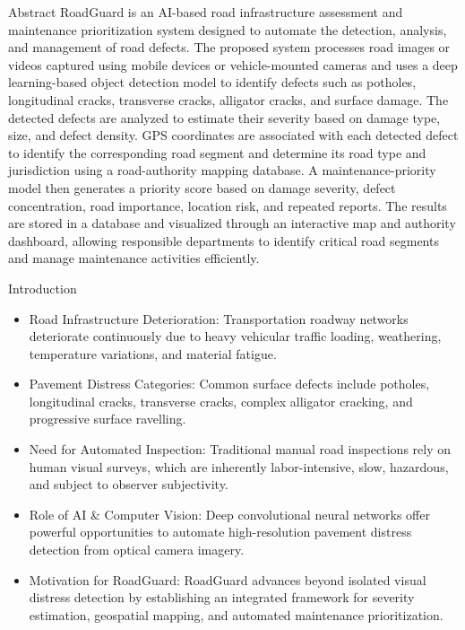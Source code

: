 \documentclass[10pt]{beamer}
\def\textbf#1{#1}%
\def\begin#1{}%
\def\end#1{}%
\begin{document}
\begin{frame}{Abstract}
    RoadGuard is an AI-based road infrastructure assessment and maintenance prioritization system designed to automate the detection, analysis, and management of road defects. The proposed system processes road images or videos captured using mobile devices or vehicle-mounted cameras and uses a deep learning-based object detection model to identify defects such as potholes, longitudinal cracks, transverse cracks, alligator cracks, and surface damage. The detected defects are analyzed to estimate their severity based on damage type, size, and defect density. GPS coordinates are associated with each detected defect to identify the corresponding road segment and determine its road type and jurisdiction using a road-authority mapping database. A maintenance-priority model then generates a priority score based on damage severity, defect concentration, road importance, location risk, and repeated reports. The results are stored in a database and visualized through an interactive map and authority dashboard, allowing responsible departments to identify critical road segments and manage maintenance activities efficiently.
\end{frame}

\begin{frame}{Introduction}
    \begin{itemize}
        \setlength{\itemsep}{0.7em}
        \item \textbf{Road Infrastructure Deterioration:} Transportation roadway networks deteriorate continuously due to heavy vehicular traffic loading, weathering, temperature variations, and material fatigue.
        \item \textbf{Pavement Distress Categories:} Common surface defects include potholes, longitudinal cracks, transverse cracks, complex alligator cracking, and progressive surface ravelling.
        \item \textbf{Need for Automated Inspection:} Traditional manual road inspections rely on human visual surveys, which are inherently labor-intensive, slow, hazardous, and subject to observer subjectivity.
        \item \textbf{Role of AI \& Computer Vision:} Deep convolutional neural networks offer powerful opportunities to automate high-resolution pavement distress detection from optical camera imagery.
        \item \textbf{Motivation for RoadGuard:} RoadGuard advances beyond isolated visual distress detection by establishing an integrated framework for severity estimation, geospatial mapping, and automated maintenance prioritization.
    \end{itemize}
\end{frame}
\end{document}
